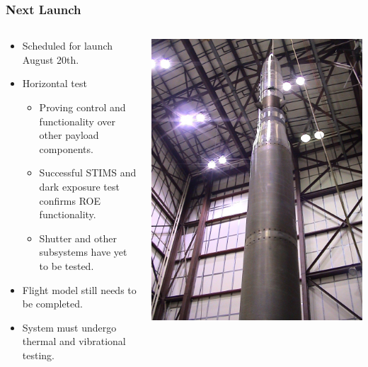 \documentclass[landscape,xcolor={table},10pt]{beamer}
\begin{document}
	\begin{frame}
		
		\frametitle{Next Launch}
		
		\begin{columns}[T] %
		\begin{column}{.49\textwidth}

			\begin{itemize}
				\item Scheduled for launch August 20th.
				\item Horizontal test
				\begin{itemize}
					\item Proving control and functionality over other payload components.
					\item Successful STIMS and dark exposure test confirms ROE functionality.
					\item Shutter and other subsystems have yet to be tested.
				\end{itemize}
				\item Flight model still needs to be completed.
				\item System must undergo thermal and vibrational testing.
			\end{itemize}			
			
		\end{column}%
		\hfill%
		\begin{column}{.49\textwidth}

			\includegraphics[width=\textwidth]{images/high}
					

\end{column}
\end{columns}
\end{frame}
\end{document}
